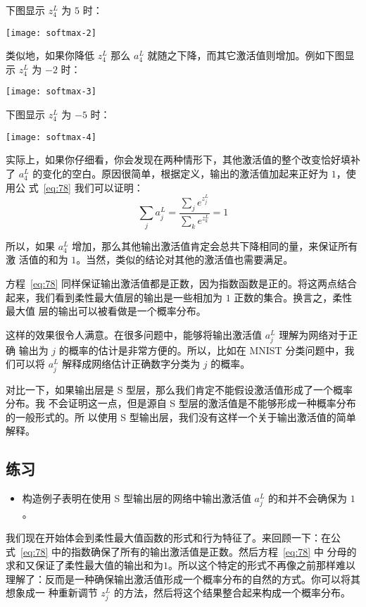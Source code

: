 下图显示 $z^L_4$ 为 $5$ 时：
\begin{center}
  \texttt{[image: softmax-2]}
\end{center}

类似地，如果你降低 $z^L_4$ 那么 $a^L_4$ 就随之下降，而其它激活值则增加。例如下图显示
 $z^L_4$ 为 $-2$ 时：
\begin{center}
  \texttt{[image: softmax-3]}
\end{center}

下图显示 $z^L_4$ 为 $-5$ 时：
\begin{center}
  \texttt{[image: softmax-4]}
\end{center}

实际上，如果你仔细看，你会发现在两种情形下，其他激活值的整个改变恰好填补了 $a^L_4$
的变化的空白。原因很简单，根据定义，输出的激活值加起来正好为 $1$，使用公
式~\eqref{eq:78} 我们可以证明：
\begin{equation}
  \sum_j a^L_j = \frac{\sum_j e^{z^L_j}}{\sum_k e^{z^L_k}} = 1
  \label{eq:79}\tag{79}
\end{equation}

所以，如果 $a^L_4$ 增加，那么其他输出激活值肯定会总共下降相同的量，来保证所有激
活值的和为 $1$。当然，类似的结论对其他的激活值也需要满足。

方程~\eqref{eq:78} 同样保证输出激活值都是正数，因为指数函数是正的。将这两点结合
起来，我们看到柔性最大值层的输出是一些相加为 $1$ 正数的集合。换言之，柔性最大值
层的输出可以被看做是一个概率分布。

这样的效果很令人满意。在很多问题中，能够将输出激活值 $a^L_j$ 理解为网络对于正确
输出为 $j$ 的概率的估计是非常方便的。所以，比如在 MNIST 分类问题中，我们可以将
$a^L_j$ 解释成网络估计正确数字分类为 $j$ 的概率。

对比一下，如果输出层是 S 型层，那么我们肯定不能假设激活值形成了一个概率分布。我
不会证明这一点，但是源自 S 型层的激活值是不能够形成一种概率分布的一般形式的。所
以使用 S 型输出层，我们没有这样一个关于输出激活值的简单解释。

\subsection*{练习}

\begin{itemize}
\item 构造例子表明在使用 S 型输出层的网络中输出激活值 $a^L_j$ 的和并不会确保为
  $1$。
\end{itemize}

我们现在开始体会到柔性最大值函数的形式和行为特征了。来回顾一下：在公
式~\eqref{eq:78} 中的指数确保了所有的输出激活值是正数。然后方程~\eqref{eq:78} 中
分母的求和又保证了柔性最大值的输出和为$1$。所以这个特定的形式不再像之前那样难以
理解了：反而是一种确保输出激活值形成一个概率分布的自然的方式。你可以将其想象成一
种重新调节 $z^L_j$ 的方法，然后将这个结果整合起来构成一个概率分布。

